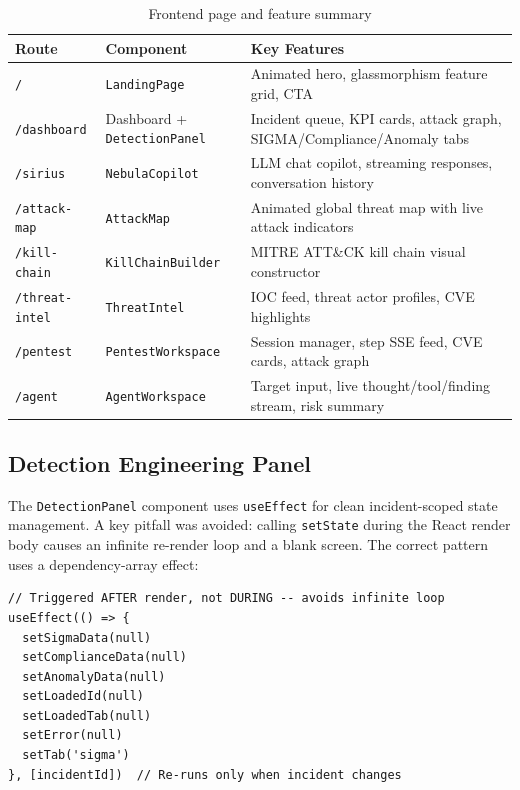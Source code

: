 \documentclass[12pt,a4paper]{article}
\begin{document}
\begin{table}[H]
\centering
\caption{Frontend page and feature summary}
\begin{tabular}{llp{6.5cm}}
\toprule
\textbf{Route} & \textbf{Component} & \textbf{Key Features} \\
\midrule
\texttt{/}            & \texttt{LandingPage}     & Animated hero, glassmorphism feature grid, CTA \\
\texttt{/dashboard}   & Dashboard + \texttt{DetectionPanel} & Incident queue, KPI cards, attack graph, SIGMA/Compliance/Anomaly tabs \\
\texttt{/sirius}      & \texttt{NebulaCopilot}   & LLM chat copilot, streaming responses, conversation history \\
\texttt{/attack-map}  & \texttt{AttackMap}       & Animated global threat map with live attack indicators \\
\texttt{/kill-chain}  & \texttt{KillChainBuilder} & MITRE ATT\&CK kill chain visual constructor \\
\texttt{/threat-intel} & \texttt{ThreatIntel}    & IOC feed, threat actor profiles, CVE highlights \\
\texttt{/pentest}     & \texttt{PentestWorkspace} & Session manager, step SSE feed, CVE cards, attack graph \\
\texttt{/agent}       & \texttt{AgentWorkspace}  & Target input, live thought/tool/finding stream, risk summary \\
\bottomrule
\end{tabular}
\end{table}

\subsection{Detection Engineering Panel}

The \texttt{DetectionPanel} component uses \texttt{useEffect} for clean incident-scoped
state management. A key pitfall was avoided: calling \texttt{setState} during the React
render body causes an infinite re-render loop and a blank screen. The correct pattern
uses a dependency-array effect:

\begin{lstlisting}[style=tsstyle, caption=Correct state reset pattern in DetectionPanel.tsx]
// Triggered AFTER render, not DURING -- avoids infinite loop
useEffect(() => {
  setSigmaData(null)
  setComplianceData(null)
  setAnomalyData(null)
  setLoadedId(null)
  setLoadedTab(null)
  setError(null)
  setTab('sigma')
}, [incidentId])  // Re-runs only when incident changes
\end{lstlisting}
\end{document}
